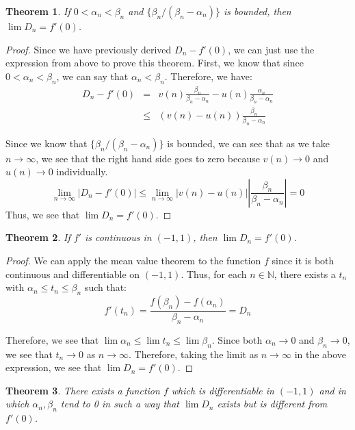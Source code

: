 \documentclass[psamsfonts]{amsart}
\newtheorem{thm}{Theorem}[section]
\theoremstyle{definition}
\theoremstyle{remark}
\numberwithin{equation}{section}
\begin{document}
\begin{thm}
If $ 0 < \alpha_n < \beta_n$ and $\{ \beta_n/ (\beta_n - \alpha_n) \}$ is bounded, then $\lim D_n = f'(0)$. 
\end{thm}

\begin{proof}
Since we have previously derived $D_n - f'(0)$, we can just use the expression from above to prove this theorem. First, we know that since $0 < \alpha_n < \beta_n$, we can say that $\alpha_n < \beta_n$. Therefore, we have:
\begin{eqnarray}
D_n - f'(0) &=& v(n) \frac{\beta_n}{\beta_n - \alpha_n} - u(n)\frac{\alpha_n}{\beta_n - \alpha_n} \\
 &\leq& (v(n) - u(n)) \frac{\beta_n}{\beta_n - \alpha_n}
\end{eqnarray}

Since we know that $\{ \beta_n / (\beta_n - \alpha_n) \}$ is bounded, we can see that as we take $n \to \infty$, we see that the right hand side goes to zero because $v(n) \to 0$ and $u(n) \to 0$ individually.
\begin{equation}
\lim_{n \to \infty} |D_n - f'(0)| \leq \lim_{n \to \infty} |v(n) - u(n)| \left| \frac{\beta_n}{\beta_n - \alpha_n} \right| = 0
\end{equation}
Thus, we see that $\lim D_n = f'(0)$.
\end{proof}

\begin{thm}
If $f'$ is continuous in $(-1,1)$, then $\lim D_n = f'(0)$. 
\end{thm}

\begin{proof}
We can apply the mean value theorem to the function $f$ since it is both continuous and differentiable on $(-1,1)$. Thus, for each $n \in \mathbb{N}$, there exists a $t_n$ with $\alpha_n \leq t_n \leq \beta_n$ such that:
\begin{equation}
f'(t_n) = \frac{f(\beta_n) - f(\alpha_n)}{\beta_n - \alpha_n} = D_n
\end{equation}

Therefore, we see that $\lim \alpha_n \leq \lim t_n \leq \lim \beta_n$. Since both $\alpha_n \to 0$ and $\beta_n \to 0$, we see that $t_n \to 0$ as $n \to \infty$. Therefore, taking the limit as $n \to \infty$ in the above expression, we see that $\lim D_n = f'(0)$. 
\end{proof}

\begin{thm}
There exists a function $f$ which is differentiable in $(-1,1)$ and in which $\alpha_n, \beta_n$ tend to 0 in such a way that $\lim D_n $ exists but is different from $f'(0)$. 
\end{thm}
\end{document}
